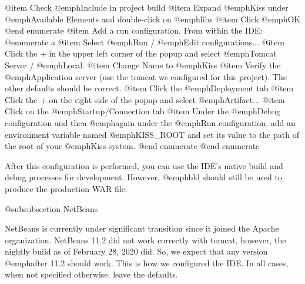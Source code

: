 @item
Check @emph{Include in project build}
@item
Expand @emph{Kiss} under @emph{Available Elements} and double-click on @emph{libs}
@item
Click @emph{OK}
@end enumerate
@item
Add a run configuration.  From within the IDE:
@enumerate a
@item
Select @emph{Run} / @emph{Edit configurations...}
@item
Click the + in the upper left corner of the popup and select @emph{Tomcat Server} / 
@emph{Local}.
@item
Change Name to @emph{Kiss}
@item
Verify the @emph{Application server} (use the tomcat we configured for this project).
The other defaults should be correct.
@item
Click the @emph{Deployment} tab
@item
Click the + on the right side of the popup and select @emph{Artifact...}
@item
Click on the @emph{Startup/Connection} tab
@item
Under the @emph{Debug} configuration and then @emph{again} under the
@emph{Run} configuration, add an environment variable named
@emph{KISS_ROOT} and set its value to the path of the root of your
@emph{Kiss} system.
@end enumerate
@end enumerate

After this configuration is performed, you can use the IDE's native
build and debug processes for development.  However, @emph{bld} should
still be used to produce the production WAR file.


@subsubsection NetBeans

NetBeans is currently under significant transition since it joined the Apache
organization.  NetBeans 11.2 did not work correctly with tomcat, however,
the nightly build as of February 28, 2020 did.  So, we expect that any version 
@emph{after} 11.2 should work.  This is how we configured the IDE.  In all cases,
when not specified otherwise. leave the defaults.

